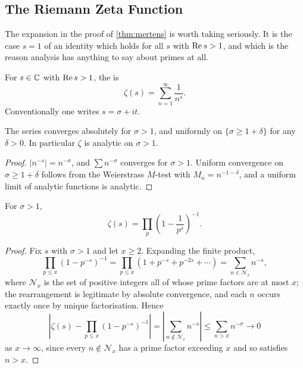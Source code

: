 \documentclass[a4paper]{scrartcl}
\begin{document}
\subsection{The Riemann Zeta Function}

The expansion in the proof of \autoref{thm:mertens} is worth taking seriously. It is the case $s = 1$ of an identity which holds for all $s$ with $\operatorname{Re} s > 1$, and which is the reason analysis has anything to say about primes at all.

\begin{definition}
	For $s \in \mathbb{C}$ with $\operatorname{Re} s > 1$, the  is
	$$
	\zeta(s) = \sum_{n=1}^\infty \frac1{n^s}.
	$$
	Conventionally one writes $s = \sigma + it$.
\end{definition}

\begin{lemma}
	The series converges absolutely for $\sigma > 1$, and uniformly on $\{\sigma \geq 1 + \delta\}$ for any $\delta > 0$. In particular $\zeta$ is analytic on $\sigma > 1$.
\end{lemma}
\begin{proof}
	$|n^{-s}| = n^{-\sigma}$, and $\sum n^{-\sigma}$ converges for $\sigma > 1$. Uniform convergence on $\sigma \geq 1+\delta$ follows from the Weierstrass $M$-test with $M_n = n^{-1-\delta}$, and a uniform limit of analytic functions is analytic.
\end{proof}

\begin{theorem}\label{thm:eulerproduct}
	For $\sigma > 1$,
	$$
	\zeta(s) = \prod_p \left(1 - \frac1{p^s}\right)^{-1}.
	$$
\end{theorem}
\begin{proof}
	Fix $s$ with $\sigma > 1$ and let $x \geq 2$. Expanding the finite product,
	$$
	\prod_{p \leq x}\left(1 - p^{-s}\right)^{-1} = \prod_{p \leq x}\left(1 + p^{-s} + p^{-2s} + \cdots\right) = \sum_{n \in \mathcal N_x} n^{-s},
	$$
	where $\mathcal N_x$ is the set of positive integers all of whose prime factors are at most $x$; the rearrangement is legitimate by absolute convergence, and each $n$ occurs exactly once by unique factorisation. Hence
	$$
	\left|\zeta(s) - \prod_{p \leq x}\left(1 - p^{-s}\right)^{-1}\right| = \left|\sum_{n \notin \mathcal N_x}n^{-s}\right| \leq \sum_{n > x}n^{-\sigma} \longrightarrow 0
	$$
	as $x \to \infty$, since every $n \notin \mathcal N_x$ has a prime factor exceeding $x$ and so satisfies $n > x$.
\end{proof}
\end{document}

